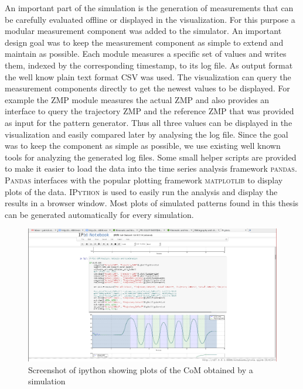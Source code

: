 \documentclass[english,ngerman]{KITreprt}
\newcommand{\name}[1]{\textsc{#1}}
\begin{document}
An important part of the simulation is the generation of measurements
that can be carefully evaluated offline or displayed in the
visualization. For this purpose a modular measurement component was
added to the simulator. An important design goal was to keep the
measurement component as simple to extend and maintain as possible. Each
module measures a specific set of values and writes them, indexed by the
corresponding timestamp, to its log file. As output format the well know
plain text format CSV was used. The visualization can query the
measurement components directly to get the newest values to be
displayed. For example the ZMP module measures the actual ZMP and also
provides an interface to query the trajectory ZMP and the reference ZMP
that was provided as input for the pattern generator. Thus all three
values can be displayed in the visualization and easily compared later
by analysing the log file. Since the goal was to keep the component as
simple as possible, we use existing well known tools for analyzing the
generated log files. Some small helper scripts are provided to make it
easier to load the data into the time series analysis framework
\name{pandas}. \name{Pandas} interfaces with the popular plotting
framework \name{matplotlib} to display plots of the data. \name{IPython}
is used to easily run the analysis and display the results in a browser
window. Most plots of simulated patterns found in this thesis can be
generated automatically for every simulation.

\begin{figure}[htb]
  \begin{center}
     \includegraphics[width=\textwidth]{images/plotting_screenshot.png}
  \end{center}
  \caption{Screenshot of ipython showing plots of the CoM obtained by a simulation}
\end{figure}
\end{document}
